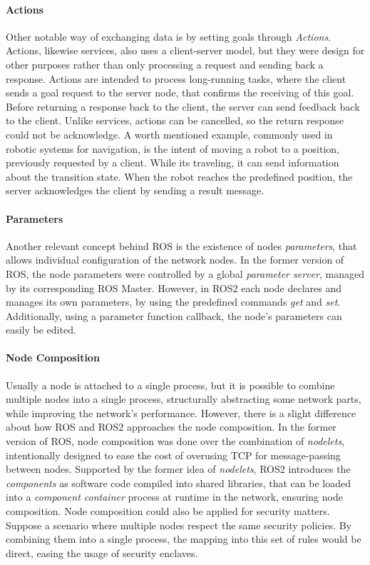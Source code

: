 \paragraph{Actions}

Other notable way of exchanging data is by setting goals through \textit{Actions}. Actions, likewise services, also uses a client-server model, but they were design for other purposes rather than only processing a request and sending back a response. Actions are intended to process long-running tasks, where the client sends a goal request to the server node, that confirms the receiving of this goal. Before returning a response back to the client, the server can send feedback back to the client. Unlike services, actions can be cancelled, so the return response could not be acknowledge. A worth mentioned example, commonly used in robotic systems for navigation, is the intent of moving a robot to a position, previously requested by a client. While its traveling, it can send information about the transition state. When the robot reaches the predefined position, the server acknowledges the client by sending a result message.


\paragraph{Parameters}   

Another relevant concept behind ROS is the existence of nodes \textit{parameters}, that allows individual configuration of the network nodes. In the former version of ROS, the node parameters were controlled by a global \textit{parameter server}, managed by its corresponding ROS Master. However, in ROS2 each node declares and manages its own parameters, by using the predefined commands \textit{get} and \textit{set}. Additionally, using a parameter function callback, the node's parameters can easily be edited.
        

\paragraph{Node Composition}  

Usually a node is attached to a single process, but it is possible to combine multiple nodes into a single process, structurally abstracting some network parts, while improving the network's performance. However, there is a slight difference about how ROS and ROS2 approaches the node composition. In the former version of ROS, node composition was done over the combination of \textit{nodelets}, intentionally designed to ease the cost of overusing TCP for message-passing between nodes. Supported by the former idea of \textit{nodelets}, ROS2 introduces the \textit{components} as software code compiled into shared libraries, that can be loaded into a \textit{component container} process at runtime in the network, ensuring node composition. Node composition could also be applied for security matters. Suppose a scenario where multiple nodes respect the same security policies. By combining them into a single process, the mapping into this set of rules would be direct, easing the usage of security enclaves.
               

